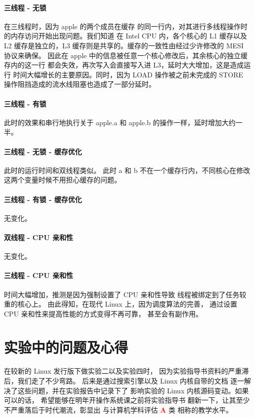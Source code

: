 \documentclass[blue,normal,cn]{elegantnote}
\begin{document}
\paragraph{三线程 - 无锁} 在三线程时，因为 apple 的两个成员在缓存
的同一行内，对其进行多线程操作时的内存访问开始出现问题。我们知道
在 Intel CPU 内，各个核心的 L1 缓存以及 L2 缓存是独立的，L3 
缓存则是共享的。缓存的一致性由经过少许修改的 MESI 协议来确保。
因此在 apple 中的信息被任意一个核心修改后，其余核心的独立缓存内的这一行
都会失效，再次写入会直接写入进 L3，延时大大增加，这是造成运行
时间大幅增长的主要原因。同时，因为 LOAD 操作被之前未完成的 STORE 
操作阻挡造成的流水线阻塞也造成了一部分延时。

\paragraph{三线程 - 有锁}
此时的效果和串行地执行关于 apple.a 和 apple.b 的操作一样，延时增加大约一半。

\paragraph{三线程 - 无锁 - 缓存优化}
此时的运行时间和双线程类似。
此时 a 和 b 不在一个缓存行内，不同核心在修改这两个变量时候不用担心缓存的问题。

\paragraph{三线程 - 有锁 - 缓存优化}
无变化。

\paragraph{双线程 - CPU 亲和性}
无变化。

\paragraph{三线程 - CPU 亲和性}
时间大幅增加，推测是因为强制设置了 CPU 亲和性导致
线程被绑定到了任务较重的核心上。
由此得知，在现代 Linux 上，因为调度算法的完善，
通过设置 CPU 亲和性来提高性能的方式变得不再可靠，
甚至会有副作用。

\section{实验中的问题及心得}

在较新的 Linux 发行版下做实验二以及实验四时，
因为实验指导书资料的严重滞后，我们走了不少弯路。
后来是通过搜索引擎以及 Linux 内核自带的文档
逐一解决了这些问题，并在实验报告中记录下了
影响实验的 Linux 内核源码变动。如果可以的话，
希望能够在明年开操作系统课之前将实验指导书
翻新一下，让其至少不严重落后于时代潮流，彰显出
与计算机学科评估 {\textcolor{red}{\LARGE{\textbf{A}}}} 类
相称的教学水平。
\end{document}

